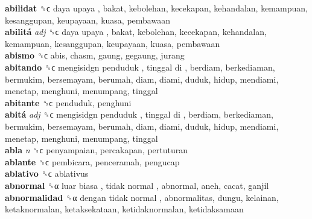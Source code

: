 \textbf{abilidat} ␝ϲ   daya upaya , bakat, kebolehan, kecekapan, kehandalan, kemampuan, kesanggupan, keupayaan, kuasa, pembawaan  \\
\textbf{abilitá} \emph{adj}  ␝ϲ   daya upaya , bakat, kebolehan, kecekapan, kehandalan, kemampuan, kesanggupan, keupayaan, kuasa, pembawaan  \\
\textbf{abismo} ␝ϲ  abis, chasm, gaung, gegaung, jurang  \\
\textbf{abitando} ␝ϲ   mengisidgn penduduk ,  tinggal di , berdiam, berkediaman, bermukim, bersemayam, berumah, diam, diami, duduk, hidup, mendiami, menetap, menghuni, menumpang, tinggal  \\
\textbf{abitante} ␝ϲ  penduduk, penghuni  \\
\textbf{abitá} \emph{adj}  ␝ϲ   mengisidgn penduduk ,  tinggal di , berdiam, berkediaman, bermukim, bersemayam, berumah, diam, diami, duduk, hidup, mendiami, menetap, menghuni, menumpang, tinggal  \\
\textbf{abla} \emph{n}  ␝ϲ  penyampaian, percakapan, pertuturan  \\
\textbf{ablante} ␝ϲ  pembicara, penceramah, pengucap  \\
\textbf{ablativo} ␝ϲ  ablativus  \\
\textbf{abnormal} ␝α   luar biasa ,  tidak normal , abnormal, aneh, cacat, ganjil  \\
\textbf{abnormalidad} ␝α   dengan tidak normal , abnormalitas, dungu, kelainan, ketaknormalan, ketaksekataan, ketidaknormalan, ketidaksamaan  \\
